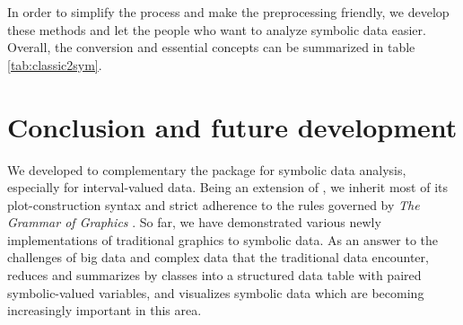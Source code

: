 \documentclass[article]{jss}
\begin{document}
In order to simplify the process and make the preprocessing friendly, we develop these methods and let the people who want to analyze symbolic data easier. Overall, the conversion and essential concepts can be summarized in table \ref{tab:classic2sym}. 

\begin{table}[t!]
\caption{\label{tab:classic2sym} Summary for  function.}
\end{table}%

 


\section{Conclusion and future development}\label{sec:conclusion}
We developed  to complementary the  package
for symbolic data analysis, especially for interval-valued data. Being
an extension of , we inherit most of its plot-construction
syntax and strict adherence to the rules governed by \emph{The Grammar
of Graphics} \cite{wilkinson2012grammar}. So far, we have demonstrated
various newly implementations of traditional graphics to symbolic
data. As an answer to the challenges of big data and complex data that
the traditional data encounter,  reduces and summarizes by
classes into a structured data table with paired symbolic-valued
variables, and visualizes symbolic data which are becoming
increasingly important in this area.
\end{document}
